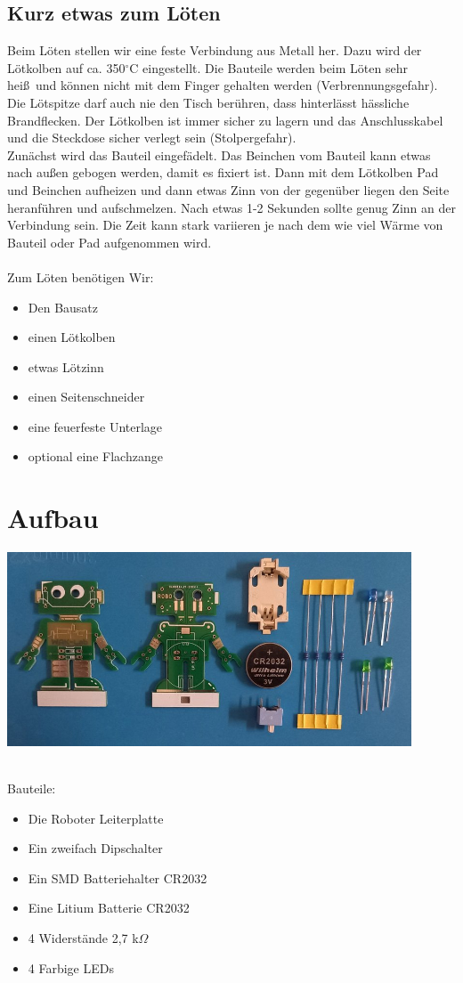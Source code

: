 \documentclass[a4paper]{article}
\begin{document}
\subsection{Kurz etwas zum Löten}
Beim Löten stellen wir eine feste Verbindung aus Metall her. Dazu wird der Lötkolben auf ca. 350$^{\circ}$C eingestellt. Die Bauteile werden beim Löten sehr hei\ss \ und können nicht mit dem Finger gehalten werden (Verbrennungsgefahr). Die Lötspitze darf auch nie den Tisch berühren, dass hinterlässt hässliche Brandflecken. Der Lötkolben ist immer sicher zu lagern und das Anschlusskabel und die Steckdose sicher verlegt sein (Stolpergefahr).\\
Zunächst wird das Bauteil eingefädelt. Das Beinchen vom Bauteil kann etwas nach au\ss en gebogen werden, damit es fixiert ist. Dann mit dem Lötkolben Pad und Beinchen aufheizen und dann etwas Zinn von der gegenüber liegen den Seite heranführen und aufschmelzen. Nach etwas 1-2 Sekunden sollte genug Zinn an der Verbindung sein. Die Zeit kann stark variieren je nach dem wie viel Wärme von Bauteil oder Pad aufgenommen wird.\\
\ \\
Zum Löten benötigen Wir:
\begin{itemize}
  \item     Den Bausatz
  \item     einen Lötkolben
  \item     etwas Lötzinn
  \item     einen Seitenschneider
  \item     eine feuerfeste Unterlage
  \item     optional eine Flachzange
\end{itemize}

\section{Aufbau}
\begin{minipage}[t]{\textwidth}
  \centering
  \includegraphics[width=0.9\textwidth]{../pictures/Parts.jpg}
  \label{img:Bauteile}
\end{minipage}
\ \\
Bauteile:
\begin{itemize}
\item Die Roboter Leiterplatte
\item Ein zweifach Dipschalter
\item Ein SMD Batteriehalter CR2032
\item Eine Litium Batterie CR2032
\item 4 Widerstände 2,7 k$\Omega$ 
\item 4 Farbige LEDs
\end{itemize}
\end{document}
